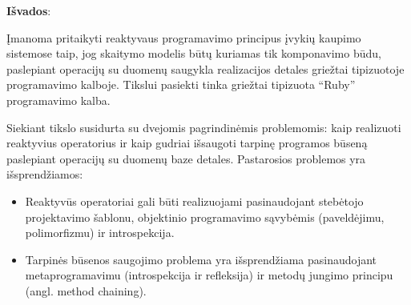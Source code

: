 \documentclass{VUMIFPSmagistrinis}
\begin{document}
\textbf{Išvados}:

Įmanoma pritaikyti reaktyvaus programavimo principus įvykių kaupimo sistemose taip, jog skaitymo modelis būtų kuriamas tik komponavimo būdu, paslepiant operacijų su duomenų saugykla realizacijos detales griežtai tipizuotoje programavimo kalboje. Tikslui pasiekti tinka griežtai tipizuota ``Ruby'' programavimo kalba.

Siekiant tikslo susidurta su dvejomis pagrindinėmis problemomis: kaip realizuoti reaktyvius operatorius ir kaip gudriai išsaugoti tarpinę programos būseną paslepiant operacijų su duomenų baze detales. Pastarosios problemos yra išsprendžiamos:

\begin{itemize}
  \item Reaktyvūs operatoriai gali būti realizuojami pasinaudojant stebėtojo projektavimo šablonu, objektinio programavimo sąvybėmis (paveldėjimu, polimorfizmu) ir introspekcija.
  \item Tarpinės būsenos saugojimo problema yra išsprendžiama pasinaudojant metaprogramavimu (introspekcija ir refleksija) ir metodų jungimo principu (angl. method chaining).
\end{itemize}

\printbibliography[heading=bibintoc]




\end{document}
